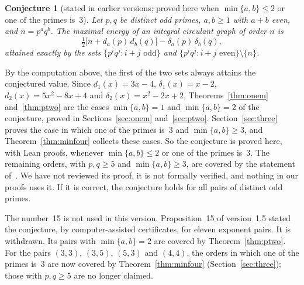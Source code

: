 \documentclass[11pt]{article}
\newtheorem{conjecture}[theorem]{Conjecture}
\theoremstyle{remark}
\begin{document}
\begin{conjecture}[stated in earlier versions; proved here when $\min\{a,b\}\le2$ or one of the primes is~$3$]\label{conj:equal}
Let $p,q$ be distinct odd primes, $a,b\ge1$ with $a+b$ even, and
$n=p^aq^b$. The maximal energy of an integral circulant graph of order $n$ is
\[
\tfrac12\bigl[n+d_a(p)\,d_b(q)\bigr]-\delta_a(p)\,\delta_b(q),
\]
attained exactly by the sets $\{p^iq^j: i+j\text{ odd}\}$ and
$\{p^iq^j: i+j\text{ even}\}\setminus\{n\}$.
\end{conjecture}


By the computation above, the first of the two sets always attains the
conjectured value. Since $d_1(x)=3x-4$, $\delta_1(x)=x-2$,
$d_2(x)=5x^2-8x+4$ and $\delta_2(x)=x^2-2x+2$, Theorems~\ref{thm:onem}
and~\ref{thm:ptwo} are the cases $\min\{a,b\}=1$ and $\min\{a,b\}=2$ of the
conjecture, proved in Sections~\ref{sec:onem} and~\ref{sec:ptwo}.
Section~\ref{sec:three} proves the case in which one of the primes is~$3$ and
$\min\{a,b\}\ge3$, and Theorem~\ref{thm:minfour} collects these cases. So the
conjecture is proved here, with Lean proofs, whenever $\min\{a,b\}\le2$ or one of
the primes is~$3$. The remaining orders, with $p,q\ge5$ and $\min\{a,b\}\ge3$, are
covered by the statement of~\cite[Theorem~A]{jy2}. We have not reviewed its proof,
it is not formally verified, and nothing in our proofs uses it. If it is correct,
the conjecture holds for all pairs of distinct odd primes.

\addtocounter{theorem}{1}%
\noindent The number~15 is not used in this version. Proposition~15 of
version~1.5 stated the conjecture, by computer-assisted certificates, for eleven
exponent pairs. It is withdrawn. Its pairs with $\min\{a,b\}=2$ are covered by
Theorem~\ref{thm:ptwo}. For the pairs $(3,3)$, $(3,5)$, $(5,3)$ and $(4,4)$, the
orders in which one of the primes is~$3$ are now covered by
Theorem~\ref{thm:minfour} (Section~\ref{sec:three}); those with $p,q\ge5$ are no
longer claimed.
\end{document}
